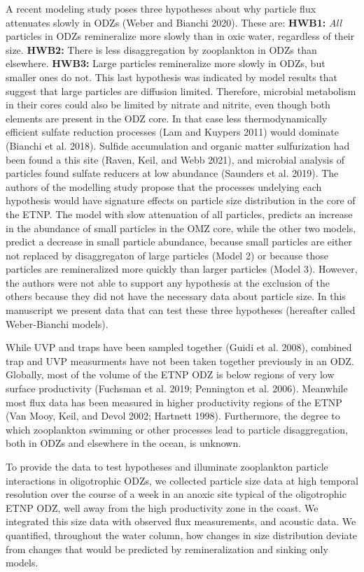 \documentclass[]{article}
\begin{document}
A recent modeling study poses three hypotheses about why particle flux
attenuates slowly in ODZs (Weber and Bianchi 2020). These are:
\textbf{HWB1:} \emph{All} particles in ODZs remineralize more slowly
than in oxic water, regardless of their size. \textbf{HWB2:} There is
less disaggregation by zooplankton in ODZs than elsewhere.
\textbf{HWB3:} Large particles remineralize more slowly in ODZs, but
smaller ones do not. This last hypothesis was indicated by model results
that suggest that large particles are diffusion limited. Therefore,
microbial metabolism in their cores could also be limited by nitrate and
nitrite, even though both elements are present in the ODZ core. In that
case less thermodynamically efficient sulfate reduction processes (Lam
and Kuypers 2011) would dominate (Bianchi et al. 2018). Sulfide
accumulation and organic matter sulfurization had been found a this site
(Raven, Keil, and Webb 2021), and microbial analysis of particles found
sulfate reducers at low abundance (Saunders et al. 2019). The authors of
the modelling study propose that the processes undelying each hypothesis
would have signature effects on particle size distribution in the core
of the ETNP. The model with slow attenuation of all particles, predicts
an increase in the abundance of small particles in the OMZ core, while
the other two models, predict a decrease in small particle abundance,
because small particles are either not replaced by disaggregaton of
large particles (Model 2) or because those particles are remineralized
more quickly than larger particles (Model 3). However, the authors were
not able to support any hypothesis at the exclusion of the others
because they did not have the necessary data about particle size. In
this manuscript we present data that can test these three hypotheses
(hereafter called Weber-Bianchi models).

While UVP and traps have been sampled together (Guidi et al. 2008),
combined trap and UVP measurments have not been taken together
previously in an ODZ. Globally, most of the volume of the ETNP ODZ is
below regions of very low surface productivity (Fuchsman et al. 2019;
Pennington et al. 2006). Meanwhile most flux data has been measured in
higher productivity regions of the ETNP (Van Mooy, Keil, and Devol 2002;
Hartnett 1998). Furthermore, the degree to which zooplankton swimming or
other processes lead to particle disaggregation, both in ODZs and
elsewhere in the ocean, is unknown.

To provide the data to test hypotheses and illuminate zooplankton
particle interactions in oligotrophic ODZs, we collected particle size
data at high temporal resolution over the course of a week in an anoxic
site typical of the oligotrophic ETNP ODZ, well away from the high
productivity zone in the coast. We integrated this size data with
observed flux measurements, and acoustic data. We quantified, throughout
the water column, how changes in size distribution deviate from changes
that would be predicted by remineralization and sinking only models.
\end{document}
